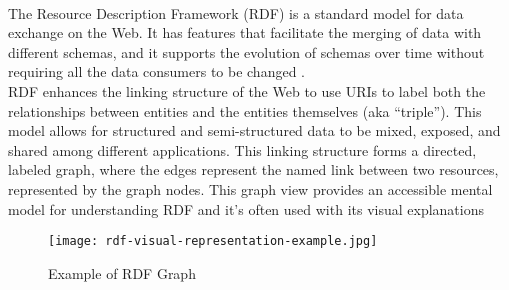 \\
The Resource Description Framework (RDF) is a standard model for data exchange on the Web. It has features that facilitate the merging of data with different schemas, and it supports the evolution of schemas over time without requiring all the data consumers to be changed \cite{rdf}.
\\
RDF enhances the linking structure of the Web to use URIs to label both the relationships between entities and the entities themselves (aka “triple”). This model allows for structured and semi-structured data to be mixed, exposed, and shared among different applications.
This linking structure forms a directed, labeled graph, where the edges represent the named link between two resources, represented by the graph nodes. This graph view provides an accessible mental model for understanding RDF and it's often used with its visual explanations
\begin{figure}[htb]
  \centering
  \texttt{[image: rdf-visual-representation-example.jpg]}\\
  \caption{Example of RDF Graph}\label{fig:RDFTriple}
\end{figure}

